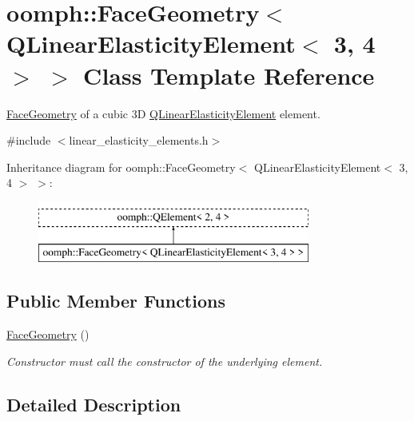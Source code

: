 \hypertarget{classoomph_1_1FaceGeometry_3_01QLinearElasticityElement_3_013_00_014_01_4_01_4}{}\section{oomph\+:\+:Face\+Geometry$<$ Q\+Linear\+Elasticity\+Element$<$ 3, 4 $>$ $>$ Class Template Reference}
\label{classoomph_1_1FaceGeometry_3_01QLinearElasticityElement_3_013_00_014_01_4_01_4}


\hyperlink{classoomph_1_1FaceGeometry}{Face\+Geometry} of a cubic 3D \hyperlink{classoomph_1_1QLinearElasticityElement}{Q\+Linear\+Elasticity\+Element} element.  




{\ttfamily \#include $<$linear\+\_\+elasticity\+\_\+elements.\+h$>$}

Inheritance diagram for oomph\+:\+:Face\+Geometry$<$ Q\+Linear\+Elasticity\+Element$<$ 3, 4 $>$ $>$\+:\begin{figure}[H]
\begin{center}
\leavevmode
\includegraphics[height=2.000000cm]{classoomph_1_1FaceGeometry_3_01QLinearElasticityElement_3_013_00_014_01_4_01_4}
\end{center}
\end{figure}
\subsection*{Public Member Functions}
\begin{DoxyCompactItemize}
\item 
\hyperlink{classoomph_1_1FaceGeometry_3_01QLinearElasticityElement_3_013_00_014_01_4_01_4_a738a2c5d9df3d69c737eddcea659ee1d}{Face\+Geometry} ()
\begin{DoxyCompactList}\small\item\em Constructor must call the constructor of the underlying element. \end{DoxyCompactList}\end{DoxyCompactItemize}


\subsection{Detailed Description}
